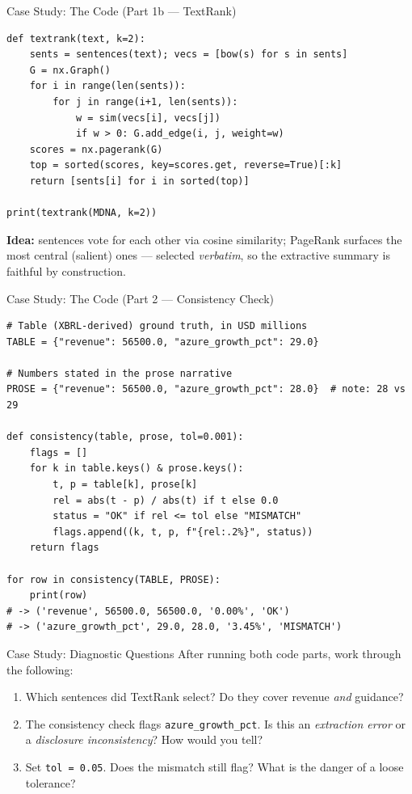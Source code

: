 \documentclass[9pt,t]{beamer}
\begin{document}
\begin{frame}[fragile]{Case Study: The Code (Part 1b --- TextRank)}
\begin{lstlisting}
def textrank(text, k=2):
    sents = sentences(text); vecs = [bow(s) for s in sents]
    G = nx.Graph()
    for i in range(len(sents)):
        for j in range(i+1, len(sents)):
            w = sim(vecs[i], vecs[j])
            if w > 0: G.add_edge(i, j, weight=w)
    scores = nx.pagerank(G)
    top = sorted(scores, key=scores.get, reverse=True)[:k]
    return [sents[i] for i in sorted(top)]

print(textrank(MDNA, k=2))
\end{lstlisting}

\medskip
\textbf{Idea:} sentences vote for each other via cosine similarity; PageRank
surfaces the most central (salient) ones --- selected \emph{verbatim}, so the
extractive summary is faithful by construction.
\end{frame}

\begin{frame}[fragile]{Case Study: The Code (Part 2 --- Consistency Check)}
\begin{lstlisting}
# Table (XBRL-derived) ground truth, in USD millions
TABLE = {"revenue": 56500.0, "azure_growth_pct": 29.0}

# Numbers stated in the prose narrative
PROSE = {"revenue": 56500.0, "azure_growth_pct": 28.0}  # note: 28 vs 29

def consistency(table, prose, tol=0.001):
    flags = []
    for k in table.keys() & prose.keys():
        t, p = table[k], prose[k]
        rel = abs(t - p) / abs(t) if t else 0.0
        status = "OK" if rel <= tol else "MISMATCH"
        flags.append((k, t, p, f"{rel:.2%}", status))
    return flags

for row in consistency(TABLE, PROSE):
    print(row)
# -> ('revenue', 56500.0, 56500.0, '0.00%', 'OK')
# -> ('azure_growth_pct', 29.0, 28.0, '3.45%', 'MISMATCH')
\end{lstlisting}
\end{frame}

\begin{frame}{Case Study: Diagnostic Questions}
After running both code parts, work through the following:
\medskip
\begin{enumerate}
  \item Which sentences did TextRank select? Do they cover revenue \emph{and} guidance?
  \item The consistency check flags \texttt{azure\_growth\_pct}. Is this an
        \emph{extraction error} or a \emph{disclosure inconsistency}? How would you tell?
  \item Set \texttt{tol = 0.05}. Does the mismatch still flag? What is the danger of a loose tolerance?
\end{enumerate}
\end{frame}
\end{document}

